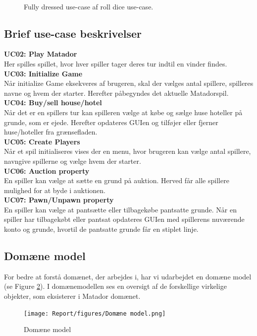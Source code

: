 \begin{flushleft}
\begin{figure}[htp]
\begin{tabular}{ |c|c|c|c|c|c|  }
    \end{tabular}\\
    \caption{Fully dressed use-case af roll dice use-case.}
    \label{fully-dressed}
\end{figure}
\doublespacing

\subsection{Brief use-case beskrivelser}
\textbf{UC02: Play Matador} \\
Her spilles spillet, hvor hver spiller tager deres tur indtil en vinder findes.  \\
\textbf{UC03: Initialize Game} \\
Når initialize Game eksekveres af brugeren, skal der vælges antal spillere, spilleres navne og hvem der starter. Herefter påbegyndes det aktuelle Matadorspil.\\
\textbf{UC04: Buy/sell house/hotel} \\
Når det er en spillers tur kan spilleren vælge at købe og sælge huse hoteller på grunde, som er ejede. Herefter opdateres GUIen og tilføjer eller fjerner huse/hoteller fra grænsefladen.\\
\textbf{UC05: Create Players} \\
Når et spil initialiseres vises der en menu, hvor brugeren kan vælge antal spillere, navngive spillerne og vælge hvem der starter.\\
\textbf{UC06: Auction property} \\
En spiller kan vælge at sætte en grund på auktion. Herved får alle spillere mulighed for at byde i auktionen.\\
\textbf{UC07: Pawn/Unpawn property} \\
En spiller kan vælge at pantsætte eller tilbagekøbe pantsatte grunde. Når en spiller har tilbagekøbt eller pantsat opdateres GUIen med spillerens nuværende konto og grunde, hvortil de pantsatte grunde får en stiplet linje.

\subsection{Domæne model}
For bedre at forstå domænet, der arbejdes i, har vi udarbejdet en domæne model (se Figure \ref{Domænemodel}). I domænemodellen ses en oversigt af de forskellige virkelige objekter, som eksisterer i Matador domænet.
\begin{figure}[H]
    \centering
    \texttt{[image: Report/figures/Domæne model.png]}
    \caption{Domæne model}
    \label{Domænemodel}
\end{figure}


\end{flushleft}
